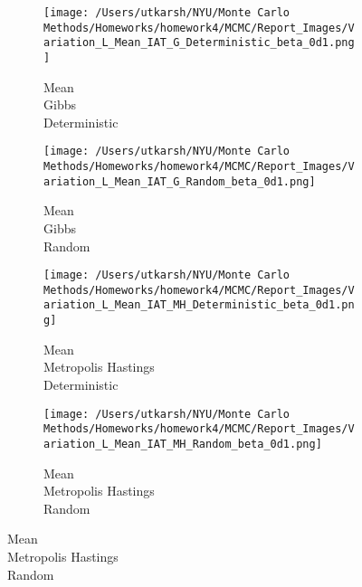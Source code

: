 \documentclass[11pt]{article}
\begin{document}
\begin{figure}[H]
	\centering
	\begin{subfigure}{.23\textwidth}
		\texttt{[image: /Users/utkarsh/NYU/Monte Carlo Methods/Homeworks/homework4/MCMC/Report\_Images/Variation\_L\_Mean\_IAT\_G\_Deterministic\_beta\_0d1.png]}
		\caption{Mean\\Gibbs\\Deterministic}
	\end{subfigure}
	\begin{subfigure}{.23\textwidth}
		\texttt{[image: /Users/utkarsh/NYU/Monte Carlo Methods/Homeworks/homework4/MCMC/Report\_Images/Variation\_L\_Mean\_IAT\_G\_Random\_beta\_0d1.png]}
		\caption{Mean\\Gibbs\\Random}
	\end{subfigure}
	\begin{subfigure}{.23\textwidth}
		\texttt{[image: /Users/utkarsh/NYU/Monte Carlo Methods/Homeworks/homework4/MCMC/Report\_Images/Variation\_L\_Mean\_IAT\_MH\_Deterministic\_beta\_0d1.png]}
		\caption{Mean\\Metropolis Hastings\\Deterministic}
	\end{subfigure}
	\begin{subfigure}{.23\textwidth}
		\texttt{[image: /Users/utkarsh/NYU/Monte Carlo Methods/Homeworks/homework4/MCMC/Report\_Images/Variation\_L\_Mean\_IAT\_MH\_Random\_beta\_0d1.png]}
		\caption{Mean\\Metropolis Hastings\\Random}
	\end{subfigure}


\end{figure}
\end{document}
